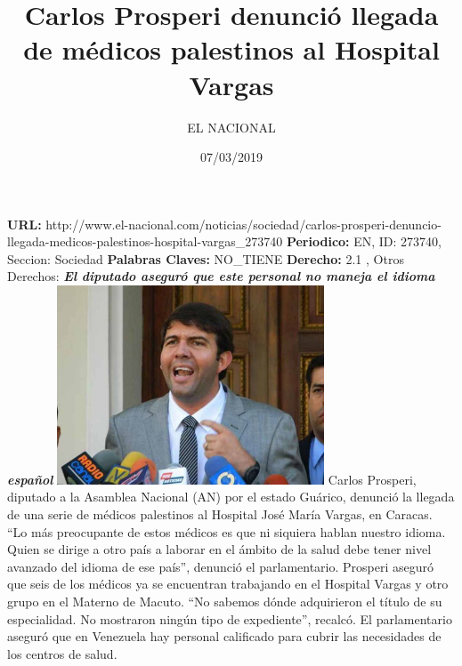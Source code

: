 \documentclass{article}%
\title{\textbf{Carlos Prosperi denunció llegada de médicos palestinos al Hospital Vargas}}%
\author{EL NACIONAL}%
\date{07/03/2019}%
\begin{document}
%
\normalsize%
\maketitle%
\textbf{URL: }%
http://www.el{-}nacional.com/noticias/sociedad/carlos{-}prosperi{-}denuncio{-}llegada{-}medicos{-}palestinos{-}hospital{-}vargas\_273740\newline%
%
\textbf{Periodico: }%
EN, %
ID: %
273740, %
Seccion: %
Sociedad\newline%
%
\textbf{Palabras Claves: }%
NO\_TIENE\newline%
%
\textbf{Derecho: }%
2.1%
, Otros Derechos: %
\newline%
%
\textbf{\textit{El diputado aseguró que este personal no maneja el idioma español}}%
\newline%
\newline%
%
\includegraphics[width=300px]{EN_273740.jpg}%
\newline%
%
Carlos Prosperi, diputado a la Asamblea Nacional (AN) por el estado Guárico, denunció la llegada de una serie de médicos palestinos al Hospital José María Vargas, en Caracas.%
\newline%
%
“Lo más preocupante de estos médicos es que ni siquiera hablan nuestro idioma. Quien se dirige a otro país a laborar en el ámbito de la salud debe tener nivel avanzado del idioma de ese país”, denunció el parlamentario.%
\newline%
%
Prosperi aseguró que seis de los médicos ya se encuentran trabajando en el Hospital Vargas y otro grupo en el Materno de Macuto.%
\newline%
%
“No sabemos dónde adquirieron el título de su especialidad. No mostraron ningún tipo de expediente”, recalcó.%
\newline%
%
El parlamentario aseguró que en Venezuela hay personal calificado para cubrir las necesidades de los centros de salud.%
\newline%
%
\end{document}
